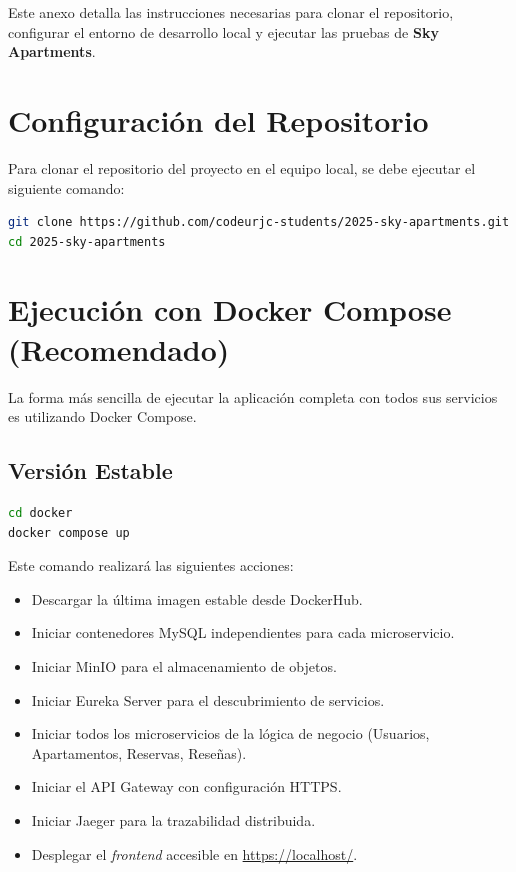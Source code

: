 Este anexo detalla las instrucciones necesarias para clonar el repositorio, configurar el entorno de desarrollo local y ejecutar las pruebas de \textbf{Sky Apartments}.

\section{Configuración del Repositorio}
Para clonar el repositorio del proyecto en el equipo local, se debe ejecutar el siguiente comando:

\begin{lstlisting}[language=bash]
git clone https://github.com/codeurjc-students/2025-sky-apartments.git
cd 2025-sky-apartments
\end{lstlisting}

\section{Ejecución con Docker Compose (Recomendado)}
La forma más sencilla de ejecutar la aplicación completa con todos sus servicios es utilizando Docker Compose.

\subsection{Versión Estable}
\begin{lstlisting}[language=bash]
cd docker
docker compose up
\end{lstlisting}
Este comando realizará las siguientes acciones:
\begin{itemize}
    \item Descargar la última imagen estable desde DockerHub.
    \item Iniciar contenedores MySQL independientes para cada microservicio.
    \item Iniciar MinIO para el almacenamiento de objetos.
    \item Iniciar Eureka Server para el descubrimiento de servicios.
    \item Iniciar todos los microservicios de la lógica de negocio (Usuarios, Apartamentos, Reservas, Reseñas).
    \item Iniciar el API Gateway con configuración HTTPS.
    \item Iniciar Jaeger para la trazabilidad distribuida.
    \item Desplegar el \textit{frontend} accesible en \url{https://localhost/}.
\end{itemize}

